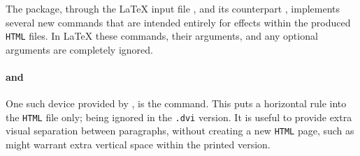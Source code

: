 \noindent
The  package, through the \LaTeX{} input file ,
and its \Perl{} counterpart , implements several 
new commands that are intended entirely for effects within the
produced \texttt{HTML} files. In \LaTeX{} these commands, their arguments,
and any optional arguments are completely ignored.

%
%
\paragraph*{ and 
 \label{htmlrule}}
One such device provided by ,
is the  command. 
This puts a horizontal rule into the \texttt{HTML} file only;
being ignored in the \texttt{.dvi} version. 
It is useful to provide extra visual separation between paragraphs,
without creating a new \texttt{HTML} page, 
such as might warrant extra vertical space within the printed version.

